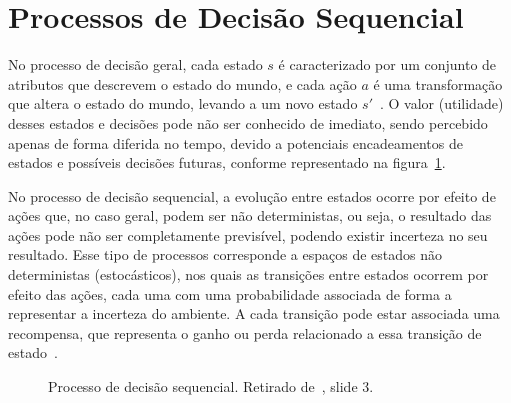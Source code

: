 \section{Processos de Decisão Sequencial}\label{sec:processos-de-decisao-sequencial}

No processo de decisão geral, cada estado $s$ é caracterizado por um conjunto de atributos que descrevem o estado do mundo, e cada ação $a$ é uma transformação que altera o estado do mundo, levando a um novo estado $s'$~\cite{isel:iasa:slides:processos-decisao-sequencial}.
O valor (utilidade) desses estados e decisões pode não ser conhecido de imediato, sendo percebido apenas de forma diferida no tempo, devido a potenciais encadeamentos de estados e possíveis decisões futuras, conforme representado na figura~\ref{fig:processo-decisao-sequencial}.

No processo de decisão sequencial, a evolução entre estados ocorre por efeito de ações que, no caso geral, podem ser não deterministas, ou seja, o resultado das ações pode não ser completamente previsível, podendo existir incerteza no seu resultado.
Esse tipo de processos corresponde a espaços de estados não deterministas (estocásticos), nos quais as transições entre estados ocorrem por efeito das ações, cada uma com uma probabilidade associada de forma a representar a incerteza do ambiente.
A cada transição pode estar associada uma recompensa, que representa o ganho ou perda relacionado a essa transição de estado~\cite{isel:iasa:slides:processos-decisao-sequencial}.

\begin{figure}[H]
    \begin{center}
    \end{center}
    \caption{Processo de decisão sequencial.
    Retirado de~\cite{isel:iasa:slides:processos-decisao-sequencial}, slide 3.}
    \label{fig:processo-decisao-sequencial}
\end{figure}


